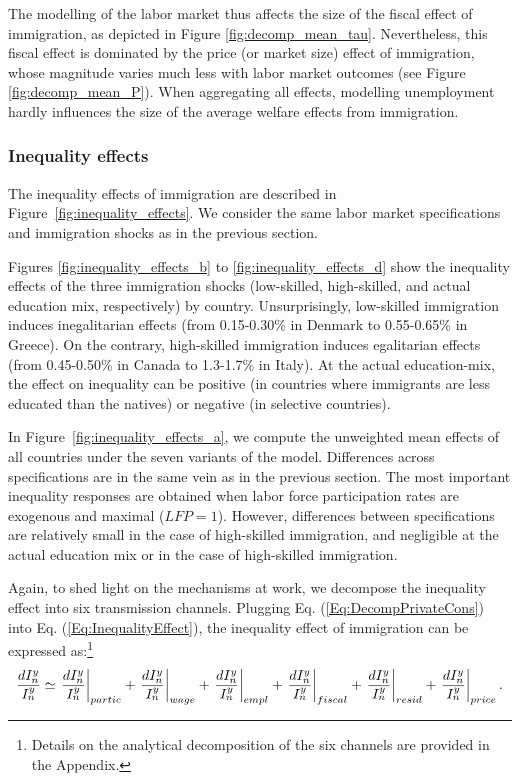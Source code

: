 \documentclass[a4paper,12pt]{article}
\begin{document}
The modelling of the labor market thus affects the size of the fiscal effect of immigration, as depicted in Figure \ref{fig:decomp_mean_tau}. Nevertheless, this fiscal effect is dominated by the price (or market size) effect of immigration, whose magnitude varies much less with labor market outcomes (see Figure \ref{fig:decomp_mean_P}). When aggregating all effects, modelling unemployment hardly influences the size of the average welfare effects from immigration.

\subsubsection{Inequality effects}
The inequality effects of immigration are described in Figure~\ref{fig:inequality_effects}. We consider the same labor market specifications and immigration shocks as in the previous section. 

Figures \ref{fig:inequality_effects_b} to \ref{fig:inequality_effects_d} show the inequality effects of the three immigration shocks (low-skilled, high-skilled, and actual education mix, respectively) by country. Unsurprisingly, low-skilled immigration induces inegalitarian effects (from 0.15-0.30\% in Denmark to 0.55-0.65\% in Greece). On the contrary, high-skilled immigration induces egalitarian effects (from 0.45-0.50\% in Canada to 1.3-1.7\% in Italy). At the actual education-mix, the effect on inequality can be positive (in countries where immigrants are less educated than the natives) or negative (in selective countries).

In Figure~\ref{fig:inequality_effects_a}, we compute the unweighted mean effects of all countries under the seven variants of the model. Differences across specifications are in the same vein as in the previous section. The most important inequality responses are obtained when labor force participation rates are exogenous and maximal ($LFP=1$). However, differences between specifications are relatively small in the case of high-skilled immigration, and negligible at the actual education mix or in the case of high-skilled immigration.

Again, to shed light on the mechanisms at work, we decompose the inequality effect into six transmission channels. Plugging Eq. (\ref{Eq:DecompPrivateCons}) into Eq. (\ref{Eq:InequalityEffect}), the inequality effect of immigration can be expressed as:\footnote{Details on the analytical decomposition of the six channels are provided in the Appendix.}
\begin{equation}
\frac{dI_{n}^{y}}{I_{n}^{y}}\simeq \left. \frac{dI_{n}^{y}}{I_{n}^{y}}%
\right \vert _{partic}+\left. \frac{dI_{n}^{y}}{I_{n}^{y}}\right \vert
_{wage}+\left. \frac{dI_{n}^{y}}{I_{n}^{y}}\right \vert _{empl}+\left. \frac{%
dI_{n}^{y}}{I_{n}^{y}}\right \vert _{fiscal}+\left. \frac{dI_{n}^{y}}{%
I_{n}^{y}}\right \vert _{resid}+\left. \frac{dI_{n}^{y}}{I_{n}^{y}}%
\right \vert _{price}. \label{Eq:DecompIneq}
\end{equation}
\end{document}
